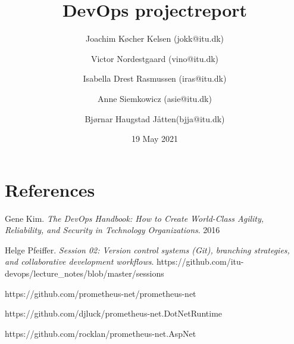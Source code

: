 \documentclass{article}
\title{DevOps projectreport}
\author{Joachim Køcher Kelsen (jokk@itu.dk) \and Victor Nordestgaard (vino@itu.dk) \and Isabella Drest Rasmussen (iras@itu.dk) \and Anne Siemkowicz (asie@itu.dk) \and Bjørnar Haugstad Jåtten(bjja@itu.dk)}
\date{19 May 2021}
\begin{document}
{}

\maketitle

\newpage

\tableofcontents

\newpage



\newpage



\newpage



\newpage



\newpage

\section{References}

\begin{thebibliography}{9}
Gene Kim.
\textit{The DevOps Handbook: How to Create World-Class Agility, Reliability, and Security in Technology Organizations}. 
2016

Helge Pfeiffer. 
\textit{Session 02: Version control systems (Git), branching strategies, and collaborative development workflows}. 
https://github.com/itu-devops/lecture_notes/blob/master/sessions

https://github.com/prometheus-net/prometheus-net

https://github.com/djluck/prometheus-net.DotNetRuntime

https://github.com/rocklan/prometheus-net.AspNet

\end{thebibliography}
\end{document}
